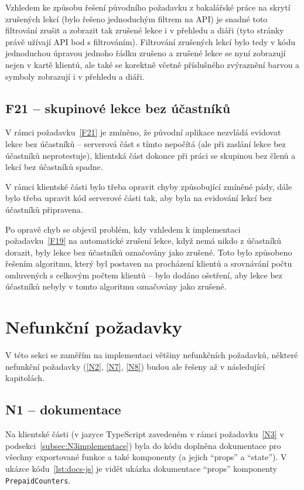 Vzhledem ke způsobu řešení původního požadavku z bakalářské práce na skrytí zrušených lekcí (bylo řešeno jednoduchým filtrem na API) je snadné toto filtrování zrušit a zobrazit tak zrušené lekce i v přehledu a diáři (tyto stránky právě užívají API bod s filtrováním). Filtrování zrušených lekcí bylo tedy v kódu jednoduchou úpravou jednoho řádku zrušeno a zrušené lekce se nyní zobrazují nejen v kartě klientů, ale také se korektně včetně příslušného zvýraznění barvou a symboly zobrazují i v přehledu a diáři.

\subsection{F21 -- skupinové lekce bez účastníků}\label{subsec:F21implementace}

V rámci požadavku~\ref{F21} je zmíněno, že původní aplikace nezvládá evidovat lekce bez účastníků -- serverová část s tímto nepočítá (ale při zaslání lekce bez účastníků neprotestuje), klientská část dokonce při práci se skupinou bez členů a lekcí bez účastníků spadne.

V rámci klientské části bylo třeba opravit chyby způsobující zmíněné pády, dále bylo třeba upravit kód serverové části tak, aby byla na evidování lekcí bez účastníků připravena.

Po opravě chyb se objevil problém, kdy vzhledem k implementaci požadavku~\ref{F19} na automatické zrušení lekce, když nemá nikdo z účastníků dorazit, byly lekce bez účastníků označovány jako zrušené. Toto bylo způsobeno řešením algoritmu, který byl postaven na procházení klientů a srovnávání počtu omluvených s celkovým počtem klientů -- bylo dodáno ošetření, aby lekce bez účastníků nebyly v tomto algoritmu označovány jako zrušené.

\section{Nefunkční požadavky}

V této sekci se zaměřím na implementaci většiny nefunkčních požadavků, některé nefunkční požadavky (\ref{N2}, \ref{N7}, \ref{N8}) budou ale řešeny až v následující kapitolách.

\subsection{N1 -- dokumentace}

Na klientské části (v jazyce TypeScript zavedeném v rámci požadavku~\ref{N3} v podsekci~\ref{subsec:N3implementace}) byla do kódu doplněna dokumentace pro všechny exportované funkce a také komponenty (a jejich \enquote{props} a \enquote{state}). V ukázce kódu~\ref{lst:docs-js} je vidět ukázka dokumentace \enquote{props} komponenty \verb|PrepaidCounters|.


